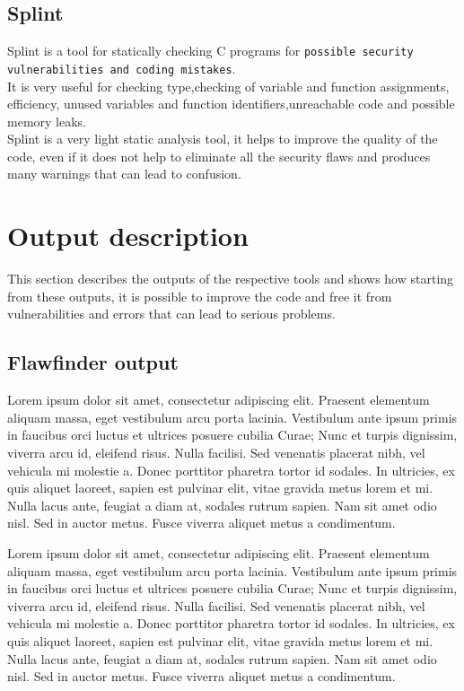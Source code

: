 \documentclass[a4paper,12pt]{article}
\begin{document}
\subsection{Splint}
Splint is a tool for statically checking C programs for \texttt{possible security vulnerabilities and coding mistakes}.\cite{splint}\\
It is very useful for checking type,checking of variable and function assignments, efficiency, unused variables and function identifiers,unreachable code and possible memory leaks.\\
Splint is a very light static analysis tool, it helps to improve the quality of the code, even if it does not help to eliminate all the security flaws and produces many warnings that can lead to confusion\cite{splint2}.



\newpage
\section{Output description}
This section describes the outputs of the respective tools and shows how starting from these outputs, it is possible to improve the code and free it from vulnerabilities and errors that can lead to serious problems.

\subsection{Flawfinder output}
Lorem ipsum dolor sit amet, consectetur adipiscing elit. Praesent elementum aliquam massa, eget vestibulum arcu porta lacinia. Vestibulum ante ipsum primis in faucibus orci luctus et ultrices posuere cubilia Curae; Nunc et turpis dignissim, viverra arcu id, eleifend risus. Nulla facilisi. Sed venenatis placerat nibh, vel vehicula mi molestie a. Donec porttitor pharetra tortor id sodales. In ultricies, ex quis aliquet laoreet, sapien est pulvinar elit, vitae gravida metus lorem et mi. Nulla lacus ante, feugiat a diam at, sodales rutrum sapien. Nam sit amet odio nisl. Sed in auctor metus. Fusce viverra aliquet metus a condimentum.


Lorem ipsum dolor sit amet, consectetur adipiscing elit. Praesent elementum aliquam massa, eget vestibulum arcu porta lacinia. Vestibulum ante ipsum primis in faucibus orci luctus et ultrices posuere cubilia Curae; Nunc et turpis dignissim, viverra arcu id, eleifend risus. Nulla facilisi. Sed venenatis placerat nibh, vel vehicula mi molestie a. Donec porttitor pharetra tortor id sodales. In ultricies, ex quis aliquet laoreet, sapien est pulvinar elit, vitae gravida metus lorem et mi. Nulla lacus ante, feugiat a diam at, sodales rutrum sapien. Nam sit amet odio nisl. Sed in auctor metus. Fusce viverra aliquet metus a condimentum.
\end{document}
